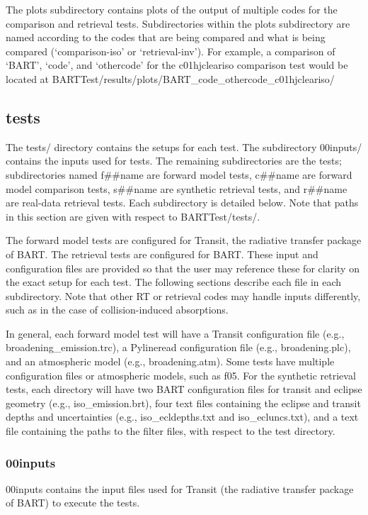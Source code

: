 \documentclass[letterpaper, 12pt]{article}
\begin{document}
The plots subdirectory contains plots of the output of multiple codes for 
the comparison and retrieval tests. Subdirectories within the plots 
subdirectory are named according to the codes that are being compared and 
what is being compared (`comparison-iso' or `retrieval-inv'). For example, a 
comparison of `BART', `code', and `othercode' for the c01hjcleariso comparison 
test would be located at 
BARTTest/results/plots/BART{\_}code{\_}othercode{\_}c01hjcleariso/

\subsection{tests}
\label{sec:tests}
The tests/ directory contains the setups for each test. 
The subdirectory 00inputs/ contains the inputs used for tests. 
The remaining subdirectories are the tests; subdirectories named f{\#}{\#}name are forward 
model tests, c{\#}{\#}name are forward model comparison tests, s{\#}{\#}name are synthetic retrieval tests, and r{\#}{\#}name are real-data retrieval tests. 
Each subdirectory is detailed below. 
Note that paths in this section are given with respect to BARTTest/tests/.

The forward model tests are configured for Transit, the radiative transfer package of BART. 
The retrieval tests are configured for BART. 
These input and configuration files are provided so that the user may reference these for clarity on the exact setup for each test. 
The following sections describe each file in each subdirectory. 
Note that other RT or retrieval codes may handle inputs differently, such as in the case of collision-induced absorptions.

In general, each forward model test will have a Transit configuration file (e.g., broadening{\_}emission.trc), a Pylineread configuration file (e.g., broadening.plc), and an atmospheric model (e.g., broadening.atm). 
Some tests have multiple configuration files or atmospheric models, such as f05. 
For the synthetic retrieval tests, each directory will have two BART configuration files for transit and eclipse geometry (e.g., iso{\_}emission.brt), four text files containing the eclipse and transit depths and uncertainties (e.g., iso{\_}ecldepths.txt and iso{\_}ecluncs.txt), and a text file containing the paths to the filter files, with respect to the test directory.

\subsubsection{00inputs}
\label{sec:inputs}
00inputs contains the input files used for Transit (the radiative transfer package of BART) to execute the tests.
\end{document}

